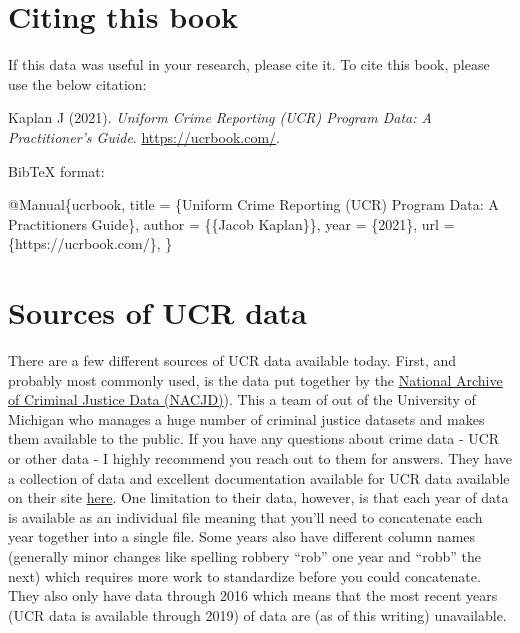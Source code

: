 \documentclass[
  12pt,
  openany]{book}
\newenvironment{Shaded}{\begin{snugshade}}{\end{snugshade}}
\newcommand{\DataTypeTok}[1]{\textcolor[rgb]{0.27,0.27,0.27}{#1}}
\newcommand{\NormalTok}[1]{#1}
\newcommand{\OtherTok}[1]{\textcolor[rgb]{0.37,0.37,0.37}{#1}}
\newcommand{\VariableTok}[1]{\textcolor[rgb]{0,0,0}{#1}}
\begin{document}
\hypertarget{citing-this-book}{%
\section{Citing this book}\label{citing-this-book}}

If this data was useful in your research, please cite it. To cite this book, please use the below citation:

Kaplan J (2021). \emph{Uniform Crime Reporting (UCR) Program Data: A Practitioner's Guide}. \url{https://ucrbook.com/}.

BibTeX format:

\begin{Shaded}
\begin{Highlighting}[]
\VariableTok{@Manual}\NormalTok{\{}\OtherTok{ucrbook}\NormalTok{,}
  \DataTypeTok{title}\NormalTok{ = \{Uniform Crime Reporting (UCR) Program Data: A Practitioner\textquotesingle{}s Guide\},}
  \DataTypeTok{author}\NormalTok{ = \{\{Jacob Kaplan\}\},}
  \DataTypeTok{year}\NormalTok{ = \{2021\},}
  \DataTypeTok{url}\NormalTok{ = \{https://ucrbook.com/\},}
\NormalTok{\}}
\end{Highlighting}
\end{Shaded}

\hypertarget{sources-of-ucr-data}{%
\section{Sources of UCR data}\label{sources-of-ucr-data}}

There are a few different sources of UCR data available today. First, and probably most commonly used, is the data put together by the \href{https://www.icpsr.umich.edu/web/pages/NACJD/index.html}{National Archive of Criminal Justice Data (NACJD)}). This a team of out of the University of Michigan who manages a huge number of criminal justice datasets and makes them available to the public. If you have any questions about crime data - UCR or other data - I highly recommend you reach out to them for answers. They have a collection of data and excellent documentation available for UCR data available on their site \href{https://www.icpsr.umich.edu/web/NACJD/series/57}{here}. One limitation to their data, however, is that each year of data is available as an individual file meaning that you'll need to concatenate each year together into a single file. Some years also have different column names (generally minor changes like spelling robbery ``rob'' one year and ``robb'' the next) which requires more work to standardize before you could concatenate. They also only have data through 2016 which means that the most recent years (UCR data is available through 2019) of data are (as of this writing) unavailable.
\end{document}
